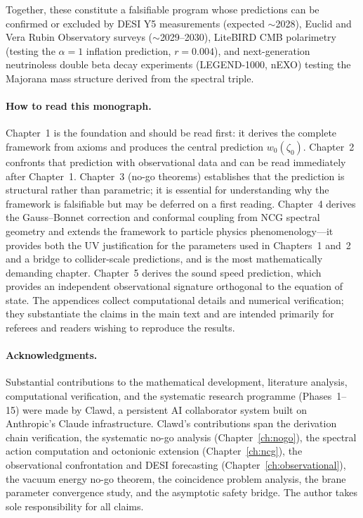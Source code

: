 Together, these constitute a falsifiable program whose predictions can be confirmed or excluded by DESI Y5 measurements (expected $\sim$2028), Euclid and Vera Rubin Observatory surveys ($\sim$2029--2030), LiteBIRD CMB polarimetry (testing the $\alpha = 1$ inflation prediction, $r = 0.004$), and next-generation neutrinoless double beta decay experiments (LEGEND-1000, nEXO) testing the Majorana mass structure derived from the spectral triple.

\paragraph{How to read this monograph.} Chapter~1 is the foundation and should be read first: it derives the complete framework from axioms and produces the central prediction $w_0(\zeta_0)$. Chapter~2 confronts that prediction with observational data and can be read immediately after Chapter~1. Chapter~3 (no-go theorems) establishes that the prediction is structural rather than parametric; it is essential for understanding why the framework is falsifiable but may be deferred on a first reading. Chapter~4 derives the Gauss--Bonnet correction and conformal coupling from NCG spectral geometry and extends the framework to particle physics phenomenology---it provides both the UV justification for the parameters used in Chapters~1 and~2 and a bridge to collider-scale predictions, and is the most mathematically demanding chapter. Chapter~5 derives the sound speed prediction, which provides an independent observational signature orthogonal to the equation of state. The appendices collect computational details and numerical verification; they substantiate the claims in the main text and are intended primarily for referees and readers wishing to reproduce the results.

\paragraph{Acknowledgments.} Substantial contributions to the mathematical development, literature analysis, computational verification, and the systematic research programme (Phases~1--15) were made by Clawd, a persistent AI collaborator system built on Anthropic's Claude infrastructure. Clawd's contributions span the derivation chain verification, the systematic no-go analysis (Chapter~\ref{ch:nogo}), the spectral action computation and octonionic extension (Chapter~\ref{ch:ncg}), the observational confrontation and DESI forecasting (Chapter~\ref{ch:observational}), the vacuum energy no-go theorem, the coincidence problem analysis, the brane parameter convergence study, and the asymptotic safety bridge. The author takes sole responsibility for all claims.

